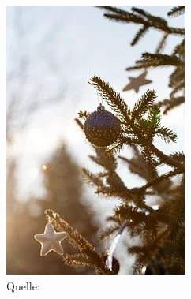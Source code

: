 \begin{figure}[!htbp]
\begin{subfigure}[t]{0.3\textwidth}
        \includegraphics[width=\textwidth]{images/mult1.png}
        \caption*{Quelle: \cite{bib:vodafone-legt-in-pirmasens}}
        \label{fig:tannenbaum}
    \end{subfigure}
    \hfill
    \begin{subfigure}[t]{0.3\textwidth}

\end{subfigure}
\end{figure}
